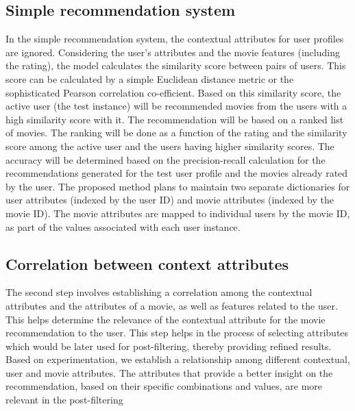 \documentclass{article}
\begin{document}
\subsection{Simple recommendation system}
In the simple recommendation system, the contextual attributes for user profiles are ignored. Considering the user's attributes and the movie features (including the rating), the model calculates the similarity score between pairs of users. This score can be calculated by a simple Euclidean distance metric or the sophisticated Pearson correlation co-efficient. Based on this similarity score, the active user (the test instance) will be recommended movies from the users with a high similarity score with it. The recommendation will be based on a ranked list of movies. The ranking will be done as a function of the rating and the similarity score among the active user and the users having higher similarity scores. The accuracy will be determined based on the precision-recall calculation for the recommendations generated for the test user profile and the movies already rated by the user. 
The proposed method plans to maintain two separate dictionaries for user attributes (indexed by the user ID) and movie attributes (indexed by the movie ID). The movie attributes are mapped to individual users by the movie ID, as part of the values associated with each user instance.

\subsection{Correlation between context attributes}
The second step involves establishing a correlation among the contextual attributes and the attributes of a movie, as well as features related to the user. This helps determine the relevance of the contextual attribute for the movie recommendation to the user. This step helps in the process of selecting attributes which would be later used for post-filtering, thereby providing refined results. Based on experimentation, we establish a relationship among different contextual, user and movie attributes. The attributes that provide a better insight on the recommendation, based on their specific combinations and values, are more relevant in the post-filtering 
\end{document}
